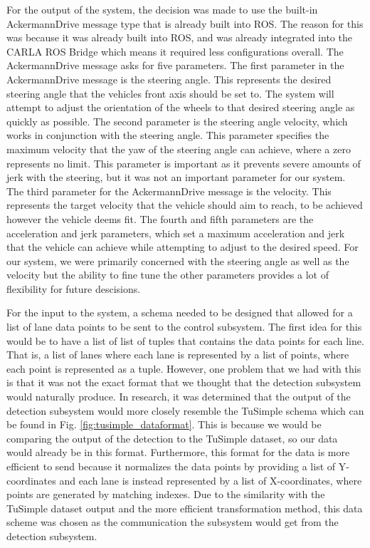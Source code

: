 \documentclass[titlepage,draft]{article}
\begin{document}
{For the output of the system, the decision was made to use the built-in AckermannDrive message type that is already built into ROS. The reason for this was because it was already built into ROS, and was already integrated into the CARLA ROS Bridge which means it required less configurations overall. The AckermannDrive message asks for five parameters. The first parameter in the AckermannDrive message is the steering angle. This represents the desired steering angle that the vehicles front axis should be set to. The system will attempt to adjust the orientation of the wheels to that desired steering angle as quickly as possible. The second parameter is the steering angle velocity, which works in conjunction with the steering angle. This parameter specifies the maximum velocity that the yaw of the steering angle can achieve, where a zero represents no limit. This parameter is important as it prevents severe amounts of jerk with the steering, but it was not an important parameter for our system. The third parameter for the AckermannDrive message is the velocity. This represents the target velocity that the vehicle should aim to reach, to be achieved however the vehicle deems fit. The fourth and fifth parameters are the acceleration and jerk parameters, which set a maximum acceleration and jerk that the vehicle can achieve while attempting to adjust to the desired speed. For our system, we were primarily concerned with the steering angle as well as the velocity but the ability to fine tune the other parameters provides a lot of flexibility for future descisions.

For the input to the system, a schema needed to be designed that allowed for a list of lane data points to be sent to the control subsystem. The first idea for this would be to have a list of list of tuples that contains the data points for each line. That is, a list of lanes where each lane is represented by a list of points, where each point is represented as a tuple. However, one problem that we had with this is that it was not the exact format that we thought that the detection subsystem would naturally produce. In research, it was determined that the output of the detection subsystem would more closely resemble the TuSimple schema which can be found in Fig. \ref{fig:tusimple_dataformat}. This is because we would be comparing the output of the detection to the TuSimple dataset, so our data would already be in this format. Furthermore, this format for the data is more efficient to send because it normalizes the data points by providing a list of Y-coordinates and each lane is instead represented by a list of X-coordinates, where points are generated by matching indexes. Due to the similarity with the TuSimple dataset output and the more efficient transformation method, this data scheme was chosen as the communication the subsystem would get from the detection subsystem.

}
\end{document}
